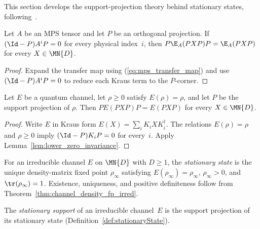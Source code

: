 This section develops the support-projection theory behind stationary states,
following~\cite[Section~6.4, Propositions~6.10--6.11]{Wolf2012Quantum}.

\begin{lemma}%
    \label{lem:lower_zero_invariance}
    \leanok
    Let $A$ be an MPS tensor and let $P$ be an orthogonal projection.
    If $(\Id-P)A^iP=0$ for every physical index~$i$, then
    $P\E_A(PXP)P=\E_A(PXP)$ for every $X\in\MN{D}$.
\end{lemma}

\begin{proof}\leanok
    Expand the transfer map using (\ref{eq:mps_transfer_map}) and use
    $(\Id-P)A^iP=0$ to reduce each Kraus term to the $P$-corner.
\end{proof}

\begin{lemma}%
    \label{thm:support_proj_fixed}
    \leanok
    Let $E$ be a quantum channel, let $\rho\geq0$ satisfy $E(\rho)=\rho$,
    and let $P$ be the support projection of $\rho$. Then
    $PE(PXP)P=E(PXP)$ for every $X\in\MN{D}$.
\end{lemma}

\begin{proof}
    \leanok
    Write $E$ in Kraus form $E(X)=\sum_iK_iXK_i^\dagger$.
    The relations $E(\rho)=\rho$ and $\rho\geq0$ imply
    $(\Id-P)K_iP=0$ for every~$i$. Apply
    Lemma~\ref{lem:lower_zero_invariance}.
\end{proof}

\begin{definition}\label{def:stationaryState}
    \leanok
    For an irreducible channel $E$ on $\MN{D}$ with $D\geq1$, the
    \emph{stationary state} is the unique density-matrix fixed point
    $\rho_\infty$ satisfying $E(\rho_\infty)=\rho_\infty$,
    $\rho_\infty>0$, and $\tr(\rho_\infty)=1$. Existence, uniqueness, and
    positive definiteness follow from
    Theorem~\ref{thm:channel_density_fp_irred}.
\end{definition}

\begin{definition}\label{def:stationarySupport}
    \leanok
    The \emph{stationary support} of an irreducible channel~$E$ is the
    support projection of its stationary state
    (Definition~\ref{def:stationaryState}).
\end{definition}

